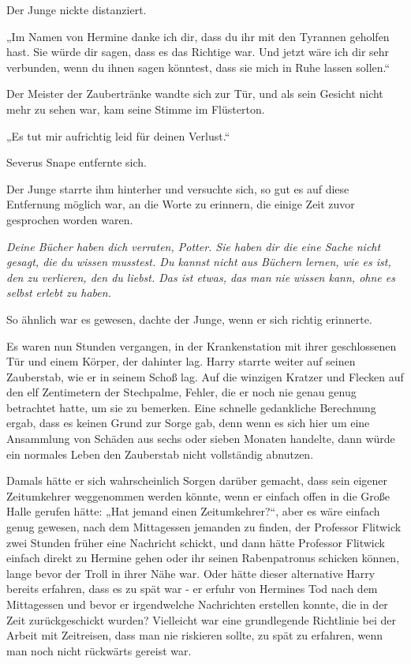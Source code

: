 {Der Junge nickte distanziert.

„Im Namen von Hermine danke ich dir, dass du ihr mit den Tyrannen geholfen hast. Sie würde dir sagen, dass es das Richtige war. Und jetzt wäre ich dir sehr verbunden, wenn du ihnen sagen könntest, dass sie mich in Ruhe lassen sollen.“

Der Meister der Zaubertränke wandte sich zur Tür, und als sein Gesicht nicht mehr zu sehen war, kam seine Stimme im Flüsterton.

„Es tut mir aufrichtig leid für deinen Verlust.“

Severus Snape entfernte sich.

Der Junge starrte ihm hinterher und versuchte sich, so gut es auf diese Entfernung möglich war, an die Worte zu erinnern, die einige Zeit zuvor gesprochen worden waren.

\emph{Deine Bücher haben dich verraten, Potter. Sie haben dir die eine Sache nicht gesagt, die du wissen musstest. Du kannst nicht aus Büchern lernen, wie es ist, den zu verlieren, den du liebst. Das ist etwas, das man nie wissen kann, ohne es selbst erlebt zu haben.}

So ähnlich war es gewesen, dachte der Junge, wenn er sich richtig erinnerte.

Es waren nun Stunden vergangen, in der Krankenstation mit ihrer geschlossenen Tür und einem Körper, der dahinter lag. Harry starrte weiter auf seinen Zauberstab, wie er in seinem Schoß lag. Auf die winzigen Kratzer und Flecken auf den elf Zentimetern der Stechpalme, Fehler, die er noch nie genau genug betrachtet hatte, um sie zu bemerken. Eine schnelle gedankliche Berechnung ergab, dass es keinen Grund zur Sorge gab, denn wenn es sich hier um eine Ansammlung von Schäden aus sechs oder sieben Monaten handelte, dann würde ein normales Leben den Zauberstab nicht vollständig abnutzen.

Damals hätte er sich wahrscheinlich Sorgen darüber gemacht, dass sein eigener Zeitumkehrer weggenommen werden könnte, wenn er einfach offen in die Große Halle gerufen hätte: „Hat jemand einen Zeitumkehrer?“, aber es wäre einfach genug gewesen, nach dem Mittagessen jemanden zu finden, der Professor Flitwick zwei Stunden früher eine Nachricht schickt, und dann hätte Professor Flitwick einfach direkt zu Hermine gehen oder ihr seinen Rabenpatronus schicken können, lange bevor der Troll in ihrer Nähe war. Oder hätte dieser alternative Harry bereits erfahren, dass es zu spät war - er erfuhr von Hermines Tod nach dem Mittagessen und bevor er irgendwelche Nachrichten erstellen konnte, die in der Zeit zurückgeschickt wurden? Vielleicht war eine grundlegende Richtlinie bei der Arbeit mit Zeitreisen, dass man nie riskieren sollte, zu spät zu erfahren, wenn man noch nicht rückwärts gereist war.

}
